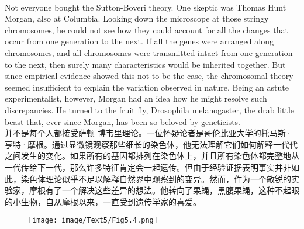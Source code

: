 \documentclass{article}
\begin{document}
\\
Not everyone bought the Sutton-Boveri theory. One skeptic was Thomas Hunt Morgan, also at Columbia. Looking down the microscope at those stringy chromosomes, he could not see how they could account for all the changes that occur from one generation to the next. If all the genes were arranged along chromosomes, and all chromosomes were transmitted intact from one generation to the next, then surely many characteristics would be inherited together. But since empirical evidence showed this not to be the case, the chromosomal theory seemed insufficient to explain the variation observed in nature. Being an astute experimentalist, however, Morgan had an idea how he might resolve such discrepancies. He turned to the fruit fly, Drosophila melanogaster, the drab little beast that, ever since Morgan, has been so beloved by geneticists.\\
并不是每个人都接受萨顿-博韦里理论。一位怀疑论者是哥伦比亚大学的托马斯·亨特·摩根。通过显微镜观察那些细长的染色体，他无法理解它们如何解释一代代之间发生的变化。如果所有的基因都排列在染色体上，并且所有染色体都完整地从一代传给下一代，那么许多特征肯定会一起遗传。但由于经验证据表明事实并非如此，染色体理论似乎不足以解释自然界中观察到的变异。然而，作为一个敏锐的实验家，摩根有了一个解决这些差异的想法。他转向了果蝇，黑腹果蝇，这种不起眼的小生物，自从摩根以来，一直受到遗传学家的喜爱。\\

\begin{figure}
    \centering
    \texttt{[image: image/Text5/Fig5.4.png]}
\end{figure}
\end{document}
